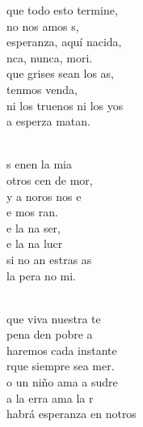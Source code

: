 \documentclass[12pt]{article}
\begin{document}
\begin{multicols*}{2}
\begin{cancion}%
	que todo esto termine,\\
	no nos amos s,\\
	esperanza, aquí nacida,\\
	nca, nunca, mori. \\
	que grises sean los as,\\
	tenmos venda,\\
	ni los truenos ni los yos\\
	a esperza matan. \\\jump\\
	\begin{chorus}%
	s enen la mia\\
	otros cen de mor,\\
	y a noros  nos e\\
	e mos ran.\\
	e la na ser,\\
	e la na lucr\\
	si no an estras as\\
	la pera no mi.\\
	\end{chorus}%
	\jump\\
	que viva  nuestra te\\
	 pena den pobre a\\
	haremos cada instante\\
	rque siempre sea mer.\\
	o un niño ama a sudre\\
	a la erra ama la r\\
	habrá esperanza en notros\\

\end{cancion}
\end{multicols*}
\end{document}

